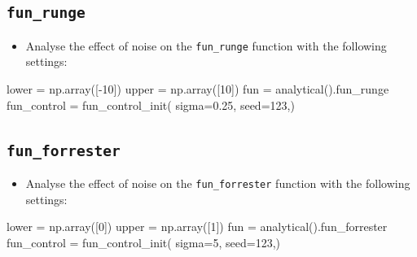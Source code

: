 \documentclass[
  letterpaper,
  DIV=11,
  numbers=noendperiod]{scrreprt}
\newenvironment{Shaded}{\begin{snugshade}}{\end{snugshade}}
\newcommand{\DecValTok}[1]{\textcolor[rgb]{0.68,0.00,0.00}{#1}}
\newcommand{\FloatTok}[1]{\textcolor[rgb]{0.68,0.00,0.00}{#1}}
\newcommand{\NormalTok}[1]{\textcolor[rgb]{0.00,0.23,0.31}{#1}}
\newcommand{\OperatorTok}[1]{\textcolor[rgb]{0.37,0.37,0.37}{#1}}
\providecommand{\tightlist}{%
  \setlength{\itemsep}{0pt}\setlength{\parskip}{0pt}}\usepackage{longtable,booktabs,array}
\begin{document}
\hypertarget{fun_runge-1}{%
\subsection{\texorpdfstring{\texttt{fun\_runge}}{fun\_runge}}\label{fun_runge-1}}

\begin{itemize}
\tightlist
\item
  Analyse the effect of noise on the \texttt{fun\_runge} function with
  the following settings:
\end{itemize}

\begin{Shaded}
\begin{Highlighting}[]
\NormalTok{lower }\OperatorTok{=}\NormalTok{ np.array([}\OperatorTok{{-}}\DecValTok{10}\NormalTok{])}
\NormalTok{upper }\OperatorTok{=}\NormalTok{ np.array([}\DecValTok{10}\NormalTok{])}
\NormalTok{fun }\OperatorTok{=}\NormalTok{ analytical().fun\_runge}
\NormalTok{fun\_control }\OperatorTok{=}\NormalTok{ fun\_control\_init(}
\NormalTok{    sigma}\OperatorTok{=}\FloatTok{0.25}\NormalTok{,}
\NormalTok{    seed}\OperatorTok{=}\DecValTok{123}\NormalTok{,)}
\end{Highlighting}
\end{Shaded}

\hypertarget{fun_forrester}{%
\subsection{\texorpdfstring{\texttt{fun\_forrester}}{fun\_forrester}}\label{fun_forrester}}

\begin{itemize}
\tightlist
\item
  Analyse the effect of noise on the \texttt{fun\_forrester} function
  with the following settings:
\end{itemize}

\begin{Shaded}
\begin{Highlighting}[]
\NormalTok{lower }\OperatorTok{=}\NormalTok{ np.array([}\DecValTok{0}\NormalTok{])}
\NormalTok{upper }\OperatorTok{=}\NormalTok{ np.array([}\DecValTok{1}\NormalTok{])}
\NormalTok{fun }\OperatorTok{=}\NormalTok{ analytical().fun\_forrester}
\NormalTok{fun\_control }\OperatorTok{=}\NormalTok{ fun\_control\_init(}
\NormalTok{    sigma}\OperatorTok{=}\DecValTok{5}\NormalTok{,}
\NormalTok{    seed}\OperatorTok{=}\DecValTok{123}\NormalTok{,)}
\end{Highlighting}
\end{Shaded}
\end{document}

